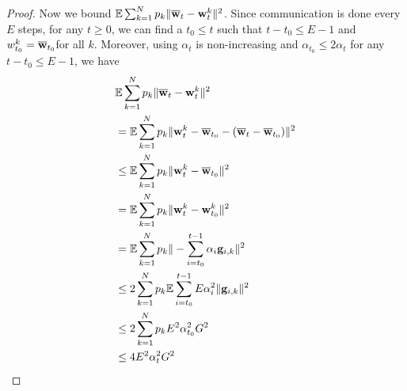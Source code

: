 \begin{proof}
	Now we bound $\mathbb{E}\sum_{k=1}^{N}p_{k}\|{\overline{\mathbf{w}}}_{t}-{\mathbf{w}}_{t}^{k}\|^{2}$.
	Since communication is done every $E$ steps, for any $t\geq0$, we
	can find a $t_{0}\leq t$ such that $t-t_{0}\leq E-1$ and $w_{t_{0}}^{k}={\overline{\mathbf{w}}}_{t_{0}}$for
	all $k$. Moreover, using $\alpha_{t}$ is non-increasing and $\alpha_{t_{0}}\leq2\alpha{}_{t}$
	for any $t-t_{0}\leq E-1$, we have 
	\begin{align*}
	& \mathbb{E}\sum_{k=1}^{N}p_{k}\|{\overline{\mathbf{w}}}_{t}-{\mathbf{w}}_{t}^{k}\|^{2}\\
	& =\mathbb{E}\sum_{k=1}^{N}p_{k}\|{\mathbf{w}}_{t}^{k}-{\overline{\mathbf{w}}}_{t_{0}}-({\overline{\mathbf{w}}}_{t}-{\overline{\mathbf{w}}}_{t_{0}})\|^{2}\\
	& \leq\mathbb{E}\sum_{k=1}^{N}p_{k}\|{\mathbf{w}}_{t}^{k}-{\overline{\mathbf{w}}}_{t_{0}}\|^{2}\\
	& =\mathbb{E}\sum_{k=1}^{N}p_{k}\|{\mathbf{w}}_{t}^{k}-{\mathbf{w}}_{t_{0}}^{k}\|^{2}\\
	& =\mathbb{E}\sum_{k=1}^{N}p_{k}\|-\sum_{i=t_{0}}^{t-1}\alpha_{i}{\mathbf{g}}_{i,k}\|^{2}\\
	& \leq2\sum_{k=1}^{N}p_{k}\mathbb{E}\sum_{i=t_{0}}^{t-1}E\alpha_{i}^{2}\|{\mathbf{g}}_{i,k}\|^{2}\\
	& \leq2\sum_{k=1}^{N}p_{k}E^{2}\alpha_{t_{0}}^{2}G^{2}\\
	& \leq4E^{2}\alpha_{t}^{2}G^{2}
	\end{align*}
	\begin{comment}
	Alternatively, we can also write
	\begin{align*}
	\sum_{k=1}^{N}p_{k}\|\ov{w}_{t}-\vw_{t}^{k}\|^{2} & =\sum_{k=1}^{N}p_{k}\|\ov{w}_{t-1}-\alpha_{t-1}\vg_{t-1}-\vw_{t-1}^{k}+\alpha_{t-1}\vg_{t-1,k}\|^{2}\\
	& \leq2\sum_{k=1}^{N}p_{k}\left(\|\ov{w}_{t-1}-\vw_{t-1}^{k}\|^{2}+\|\alpha_{t-1}\vg_{t-1}-\alpha_{t-1}\vg_{t-1,k}\|^{2}\right)
	\end{align*}
	and write 
	\begin{align*}
	\sum_{k}p_{k}\|\vg_{t-1,k}-\vg_{t-1}\|^{2}\leq\sum_{k}p_{k}\|\vg_{t-1,k}\|^{2} & =\sum_{k}p_{k}\|\vg_{t-1,k}-\nabla F_{k}(\vw_{t-1}^{k})+\nabla F_{k}(\vw_{t-1}^{k})\|^{2}\\
	& \leq2\sum_{k}p_{k}\|\vg_{t-1,k}-\nabla F_{k}(\vw_{t-1}^{k})\|^{2}+2\sum_{k}p_{k}\|\nabla F_{k}(\vw_{t-1}^{k})\|^{2}\\
	& \leq2\sum_{k}p_{k}\sigma_{k}^{2}+2\sum_{k}p_{k}\|\nabla F_{k}(\vw_{t-1}^{k})-\nabla F_{k}(\ov{w}_{t-1})+\nabla F_{k}(\ov{w}_{t-1})\|^{2}\\
	& \leq2\sum_{k}p_{k}\sigma_{k}^{2}+4\sum_{k}p_{k}\left(\|\nabla F_{k}(\vw_{t-1}^{k})-\nabla F_{k}(\ov{w}_{t-1})\|^{2}+\|\nabla F_{k}(\ov{w}_{t-1})\|^{2}\right)\\

\end{comment}
\end{proof}
